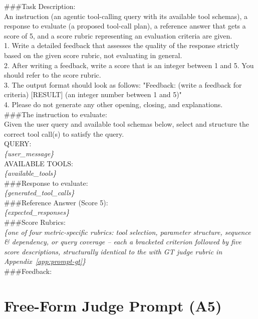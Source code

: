 \begin{promptbox}
\ttfamily\small
\#\#\#Task Description:\\
An instruction (an agentic tool-calling query with its available tool schemas), a response to evaluate (a proposed tool-call plan), a reference answer that gets a score of 5, and a score rubric representing an evaluation criteria are given.\\
1. Write a detailed feedback that assesses the quality of the response strictly based on the given score rubric, not evaluating in general.\\
2. After writing a feedback, write a score that is an integer between 1 and 5. You should refer to the score rubric.\\
3. The output format should look as follows: "Feedback: (write a feedback for criteria) [RESULT] (an integer number between 1 and 5)"\\
4. Please do not generate any other opening, closing, and explanations.\\[4pt]
\#\#\#The instruction to evaluate:\\
Given the user query and available tool schemas below, select and structure the correct tool call(s) to satisfy the query.\\[2pt]
QUERY:\\
\textit{\{user\_message\}}\\[4pt]
AVAILABLE TOOLS:\\
\textit{\{available\_tools\}}\\[4pt]
\#\#\#Response to evaluate:\\
\textit{\{generated\_tool\_calls\}}\\[4pt]
\#\#\#Reference Answer (Score 5):\\
\textit{\{expected\_responses\}}\\[4pt]
\#\#\#Score Rubrics:\\
\textit{\{one of four metric-specific rubrics: tool selection, parameter structure, sequence \& dependency, or query coverage -- each a bracketed criterion followed by five score descriptions, structurally identical to the with GT judge rubric in Appendix~\ref{app:prompt-gt}\}}\\[4pt]
\#\#\#Feedback:
\end{promptbox}

\section{Free-Form Judge Prompt (A5)}
\label{app:prompt-freeform}

